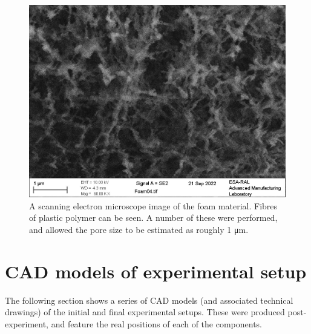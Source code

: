 \begin{figure}[ht]
\begin{centering}
\includegraphics[width=1.0\textwidth]{figures/AppendixExperiment/FoamSEM.jpg}%
\caption{\label{fig:Appx-Foam04} A scanning electron microscope image of the foam material. Fibres of plastic polymer can be seen. A number of these were performed, and allowed the pore size to be estimated as roughly 1 \unit{\micro\meter}.}
\end{centering}
\end{figure}

\section{CAD models of experimental setup}

The following section shows a series of CAD models (and associated technical drawings) of the initial and final experimental setups. These were produced post-experiment, and feature the real positions of each of the components.


